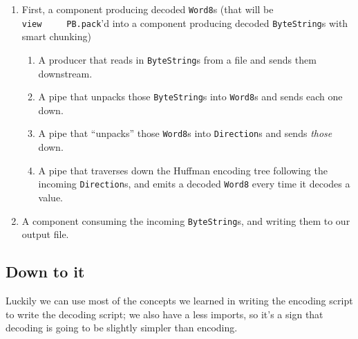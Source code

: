 \documentclass[]{article}
\begin{document}
\begin{enumerate}
\def\labelenumi{\arabic{enumi}.}
\tightlist
\item
  First, a component producing decoded \texttt{Word8}s (that will be
  \texttt{view\ \ \ \ \ PB.pack}'d into a component producing decoded
  \texttt{ByteString}s with smart chunking)

  \begin{enumerate}
  \def\labelenumii{\arabic{enumii}.}
  \tightlist
  \item
    A producer that reads in \texttt{ByteString}s from a file and sends them
    downstream.
  \item
    A pipe that unpacks those \texttt{ByteString}s into \texttt{Word8}s and
    sends each one down.
  \item
    A pipe that ``unpacks'' those \texttt{Word8}s into \texttt{Direction}s and
    sends \emph{those} down.
  \item
    A pipe that traverses down the Huffman encoding tree following the incoming
    \texttt{Direction}s, and emits a decoded \texttt{Word8} every time it
    decodes a value.
  \end{enumerate}
\item
  A component consuming the incoming \texttt{ByteString}s, and writing them to
  our output file.
\end{enumerate}

\subsection{Down to it}\label{down-to-it-1}

Luckily we can use most of the concepts we learned in writing the encoding
script to write the decoding script; we also have a less imports, so it's a sign
that decoding is going to be slightly simpler than encoding.
\end{document}

